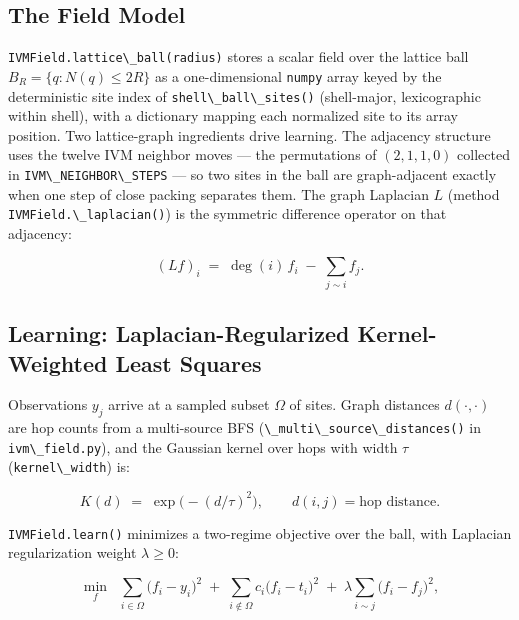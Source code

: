 \documentclass[
  10pt,
]{article}
\newcommand{\passthrough}[1]{#1}
\begin{document}
\subsection{The Field Model}\label{the-field-model}

\passthrough{\lstinline!IVMField.lattice\_ball(radius)!} stores a scalar
field over the lattice ball \(B_R = \{ q : N(q) \leq 2R \}\) as a
one-dimensional \passthrough{\lstinline!numpy!} array keyed by the
deterministic site index of
\passthrough{\lstinline!shell\_ball\_sites()!} (shell-major,
lexicographic within shell), with a dictionary mapping each normalized
site to its array position. Two lattice-graph ingredients drive
learning. The adjacency structure uses the twelve IVM neighbor moves ---
the permutations of \((2,1,1,0)\) collected in
\passthrough{\lstinline!IVM\_NEIGHBOR\_STEPS!} --- so two sites in the
ball are graph-adjacent exactly when one step of close packing separates
them. The graph Laplacian \(L\) (method
\passthrough{\lstinline!IVMField.\_laplacian()!}) is the symmetric
difference operator on that adjacency:

\begin{equation}
\label{eq:ivm-laplacian}
(L f)_i \;=\; \deg(i)\, f_i \;-\; \sum_{j \sim i} f_j .
\end{equation}

\subsection{Learning: Laplacian-Regularized Kernel-Weighted Least
Squares}\label{learning-laplacian-regularized-kernel-weighted-least-squares}

Observations \(y_j\) arrive at a sampled subset \(\Omega\) of sites.
Graph distances \(d(\cdot,\cdot)\) are hop counts from a multi-source
BFS (\passthrough{\lstinline!\_multi\_source\_distances()!} in
\passthrough{\lstinline!ivm\_field.py!}), and the Gaussian kernel over
hops with width \(\tau\) (\passthrough{\lstinline!kernel\_width!}) is:

\begin{equation}
\label{eq:ivm-kernel}
K(d) \;=\; \exp\!\bigl( -(d/\tau)^2 \bigr), \qquad d(i,j) = \text{hop distance}.
\end{equation}

\passthrough{\lstinline!IVMField.learn()!} minimizes a two-regime
objective over the ball, with Laplacian regularization weight
\(\lambda \geq 0\):

\begin{equation}
\label{eq:ivm-objective}
\min_{f} \;\; \sum_{i \in \Omega} \bigl( f_i - y_i \bigr)^2
\;+\; \sum_{i \notin \Omega} c_i \bigl( f_i - t_i \bigr)^2
\;+\; \lambda \sum_{i \sim j} \bigl( f_i - f_j \bigr)^2 ,
\end{equation}
\end{document}
